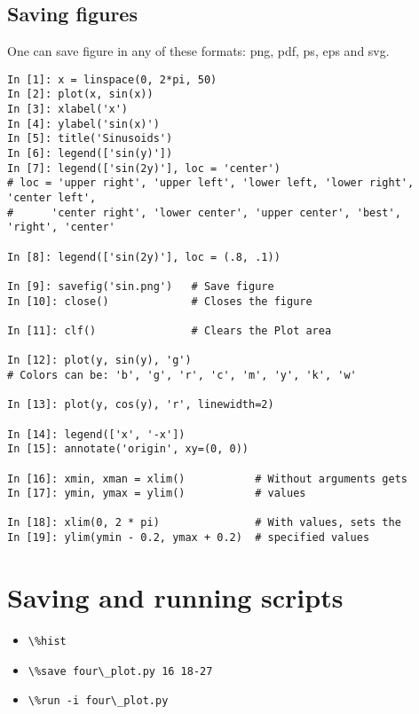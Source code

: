 \documentclass[12pt]{article}
\newcommand{\typ}[1]{\lstinline{#1}}
\begin{document}
\subsection{Saving figures}
One can save figure in any of these formats: png, pdf, ps, eps and svg.
  \begin{lstlisting}
In [1]: x = linspace(0, 2*pi, 50)
In [2]: plot(x, sin(x))
In [3]: xlabel('x')
In [4]: ylabel('sin(x)')
In [5]: title('Sinusoids')
In [6]: legend(['sin(y)'])
In [7]: legend(['sin(2y)'], loc = 'center')
# loc = 'upper right', 'upper left', 'lower left, 'lower right', 'center left',
#      'center right', 'lower center', 'upper center', 'best', 'right', 'center'

In [8]: legend(['sin(2y)'], loc = (.8, .1))

In [9]: savefig('sin.png')   # Save figure
In [10]: close()             # Closes the figure

In [11]: clf()               # Clears the Plot area

In [12]: plot(y, sin(y), 'g')
# Colors can be: 'b', 'g', 'r', 'c', 'm', 'y', 'k', 'w'

In [13]: plot(y, cos(y), 'r', linewidth=2)

In [14]: legend(['x', '-x'])
In [15]: annotate('origin', xy=(0, 0))

In [16]: xmin, xman = xlim()           # Without arguments gets
In [17]: ymin, ymax = ylim()           # values

In [18]: xlim(0, 2 * pi)               # With values, sets the
In [19]: ylim(ymin - 0.2, ymax + 0.2)  # specified values
  \end{lstlisting}

\section{Saving and running scripts}
\begin{itemize}
  \item \typ{\%hist}
  \item \typ{\%save four\_plot.py 16 18-27}
  \item \typ{\%run -i four\_plot.py}
\end{itemize}
\end{document}

